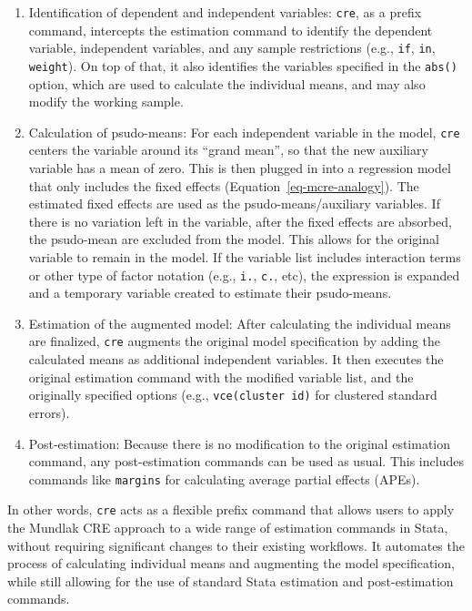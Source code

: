 \documentclass[bib]{statapress}
\begin{document}
\begin{enumerate}
\def\labelenumi{\arabic{enumi}.}
\item
  Identification of dependent and independent variables: \texttt{cre},
  as a prefix command, intercepts the estimation command to identify the
  dependent variable, independent variables, and any sample restrictions
  (e.g., \texttt{if}, \texttt{in}, \texttt{weight}). On top of that, it
  also identifies the variables specified in the \texttt{abs()} option,
  which are used to calculate the individual means, and may also modify
  the working sample.
\item
  Calculation of psudo-means: For each independent variable in the
  model, \texttt{cre} centers the variable around its ``grand mean'', so
  that the new auxiliary variable has a mean of zero. This is then
  plugged in into a regression model that only includes the fixed
  effects (Equation~\ref{eq-mcre-analogy}). The estimated fixed effects
  are used as the psudo-means/auxiliary variables. If there is no
  variation left in the variable, after the fixed effects are absorbed,
  the psudo-mean are excluded from the model. This allows for the
  original variable to remain in the model. If the variable list
  includes interaction terms or other type of factor notation (e.g.,
  \texttt{i.}, \texttt{c.}, etc), the expression is expanded and a
  temporary variable created to estimate their psudo-means.
\item
  Estimation of the augmented model: After calculating the individual
  means are finalized, \texttt{cre} augments the original model
  specification by adding the calculated means as additional independent
  variables. It then executes the original estimation command with the
  modified variable list, and the originally specified options (e.g.,
  \texttt{vce(cluster\ id)} for clustered standard errors).
\item
  Post-estimation: Because there is no modification to the original
  estimation command, any post-estimation commands can be used as usual.
  This includes commands like \texttt{margins} for calculating average
  partial effects (APEs).
\end{enumerate}

In other words, \texttt{cre} acts as a flexible prefix command that
allows users to apply the Mundlak CRE approach to a wide range of
estimation commands in Stata, without requiring significant changes to
their existing workflows. It automates the process of calculating
individual means and augmenting the model specification, while still
allowing for the use of standard Stata estimation and post-estimation
commands.
\end{document}

